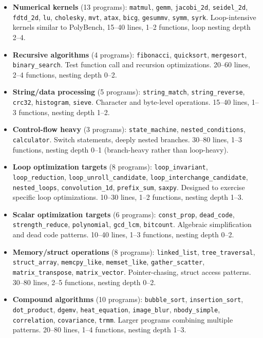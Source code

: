 \documentclass[11pt]{article}
\begin{document}
\begin{itemize}[nosep]
  \item \textbf{Numerical kernels} (13 programs): \texttt{matmul}, \texttt{gemm}, \texttt{jacobi\_2d}, \texttt{seidel\_2d}, \texttt{fdtd\_2d}, \texttt{lu}, \texttt{cholesky}, \texttt{mvt}, \texttt{atax}, \texttt{bicg}, \texttt{gesummv}, \texttt{symm}, \texttt{syrk}. Loop-intensive kernels similar to PolyBench, 15--40 lines, 1--2 functions, loop nesting depth 2--4.
  \item \textbf{Recursive algorithms} (4 programs): \texttt{fibonacci}, \texttt{quicksort}, \texttt{mergesort}, \texttt{binary\_search}. Test function call and recursion optimizations. 20--60 lines, 2--4 functions, nesting depth 0--2.
  \item \textbf{String/data processing} (5 programs): \texttt{string\_match}, \texttt{string\_reverse}, \texttt{crc32}, \texttt{histogram}, \texttt{sieve}. Character and byte-level operations. 15--40 lines, 1--3 functions, nesting depth 1--2.
  \item \textbf{Control-flow heavy} (3 programs): \texttt{state\_machine}, \texttt{nested\_conditions}, \texttt{calculator}. Switch statements, deeply nested branches. 30--80 lines, 1--3 functions, nesting depth 0--1 (branch-heavy rather than loop-heavy).
  \item \textbf{Loop optimization targets} (8 programs): \texttt{loop\_invariant}, \texttt{loop\_reduction}, \texttt{loop\_unroll\_candidate}, \texttt{loop\_interchange\_candidate}, \texttt{nested\_loops}, \texttt{convolution\_1d}, \texttt{prefix\_sum}, \texttt{saxpy}. Designed to exercise specific loop optimizations. 10--30 lines, 1--2 functions, nesting depth 1--3.
  \item \textbf{Scalar optimization targets} (6 programs): \texttt{const\_prop}, \texttt{dead\_code}, \texttt{strength\_reduce}, \texttt{polynomial}, \texttt{gcd\_lcm}, \texttt{bitcount}. Algebraic simplification and dead code patterns. 10--40 lines, 1--3 functions, nesting depth 0--2.
  \item \textbf{Memory/struct operations} (8 programs): \texttt{linked\_list}, \texttt{tree\_traversal}, \texttt{struct\_array}, \texttt{memcpy\_like}, \texttt{memset\_like}, \texttt{gather\_scatter}, \texttt{matrix\_transpose}, \texttt{matrix\_vector}. Pointer-chasing, struct access patterns. 30--80 lines, 2--5 functions, nesting depth 0--2.
  \item \textbf{Compound algorithms} (10 programs): \texttt{bubble\_sort}, \texttt{insertion\_sort}, \texttt{dot\_product}, \texttt{dgemv}, \texttt{heat\_equation}, \texttt{image\_blur}, \texttt{nbody\_simple}, \texttt{correlation}, \texttt{covariance}, \texttt{trmm}. Larger programs combining multiple patterns. 20--80 lines, 1--4 functions, nesting depth 1--3.
\end{itemize}
\end{document}
